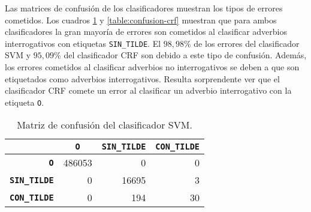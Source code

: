 \documentclass[runningheads,a4paper]{llncs}
\begin{document}
Las matrices de confusi\'on de los clasificadores muestran los tipos de errores cometidos. Los cuadros \ref{table:confusion-svm} y \ref{table:confusion-crf} muestran que para ambos clasificadores la gran mayor\'ia de errores son cometidos al clasificar adverbios interrogativos con etiquetas \texttt{\small SIN\_TILDE}. El $98,98\%$ de los errores del clasificador SVM y $95,09\%$ del clasificador CRF son debido a este tipo de confusi\'on. Además, los errores cometidos al clasificar adverbios no interrogativos se deben a que son etiquetados como adverbios interrogativos. Resulta sorprendente ver que el clasificador CRF comete un error al clasificar un adverbio interrogativo con la etiqueta \texttt{\small O}.

\begin{table}[ht]
 	\renewcommand{\arraystretch}{1.3}
	\renewcommand{\tabcolsep}{3pt}
	\caption{Matriz de confusión del clasificador SVM.}
	\label{table:confusion-svm}
	\centering
	\begin{tabular}{|r||r|r|r|}
		\hline
			& \multicolumn{1}{c|}{\textbf{\texttt{~O~}}}
			& \multicolumn{1}{c|}{\textbf{\texttt{SIN\_TILDE}}}
			& \multicolumn{1}{c|}{\textbf{\texttt{CON\_TILDE}}} \\
		\hline\hline
		\textbf{\texttt{O}} & 486053 & 0 & 0 \\ \hline
		\textbf{\texttt{SIN\_TILDE}} & 0 & 16695 & 3 \\ \hline
		\textbf{\texttt{CON\_TILDE}} & 0 & 194 & 30 \\ 
		\hline
	\end{tabular}
\end{table}
\end{document}
